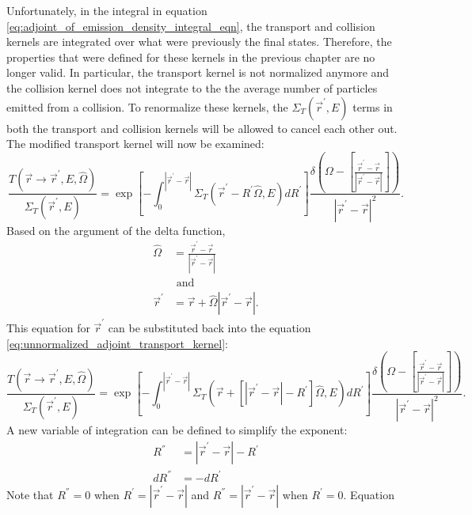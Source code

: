 Unfortunately, in the integral in equation 
\ref{eq:adjoint_of_emission_density_integral_eqn}, the transport and collision 
kernels are integrated over what were previously the final states. Therefore,
the properties that were defined for these kernels in the previous chapter are 
no longer valid. In particular, the transport kernel is not normalized anymore
and the collision kernel does not integrate to the the average number of 
particles emitted from a collision. To renormalize these kernels, the 
$\Sigma_T(\vec{r}^{'},E)$ terms in both the transport and collision kernels will
be allowed to cancel each other out. The modified transport kernel will now be 
examined:
\begin{equation}
  \frac{T(\vec{r} \to \vec{r}^{'},E,\hat{\Omega})}{\Sigma_T(\vec{r}^{'},E)} = 
  \exp{\left[-\int_0^{|\vec{r}^{'} - \vec{r}|} 
    \Sigma_T(\vec{r}^{'} - R^{'} \hat{\Omega},E)dR^{'} \right]}
  \frac{\delta \left(\Omega - \left[\frac{\vec{r}^{'} - \vec{r}}
      {|\vec{r}^{'} - \vec{r}|}\right]\right)}
       {|\vec{r}^{'} - \vec{r}|^2}.
  \label{eq:unnormalized_adjoint_transport_kernel}
\end{equation}
Based on the argument of the delta function, 
\begin{align}
  \hat{\Omega} & = \frac{\vec{r}^{'} - \vec{r}}{|\vec{r}^{'} - \vec{r}|} 
  \nonumber \\
  & \text{ and} \nonumber \\
  \vec{r}^{'} & = \vec{r} + \hat{\Omega}|\vec{r}^{'} - \vec{r}|.
\end{align}
This equation for $\vec{r}^{'}$ can be substituted back into the equation
\ref{eq:unnormalized_adjoint_transport_kernel}:
\begin{equation*}
  \frac{T(\vec{r} \to \vec{r}^{'},E,\hat{\Omega})}{\Sigma_T(\vec{r}^{'},E)} = 
  \exp{\left[-\int_0^{|\vec{r}^{'} - \vec{r}|} 
    \Sigma_T \left(\vec{r} + \left[|\vec{r}^{'} - \vec{r}| - R^{'} \right]
    \hat{\Omega},E \right) dR^{'} 
    \right]} \frac{\delta \left(\Omega - \left[\frac{\vec{r}^{'} - \vec{r}}
      {|\vec{r}^{'} - \vec{r}|}\right]\right)}
       {|\vec{r}^{'} - \vec{r}|^2}.
\end{equation*}
A new variable of integration can be defined to simplify the exponent:
\begin{align}
  R^{''} & = |\vec{r}^{'} - \vec{r}| - R^{'} \\
  dR^{''} & = -dR^{'} \nonumber 
\end{align}
Note that $R^{''} = 0$ when $R^{'} = |\vec{r}^{'} - \vec{r}|$ and 
$R^{''} = |\vec{r}^{'} - \vec{r}|$ when $R^{'} = 0$. Equation 

